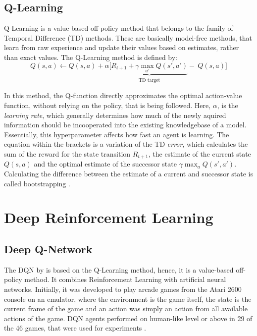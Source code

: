 \subsection{Q-Learning}
\label{ssec:q_learning}
Q-Learning is a value-based off-policy method that belongs to the family of Temporal Difference (TD) methods. These are basically model-free methods, that learn from raw experience and update their values based on estimates, rather than exact values. The Q-Learning method is defined by:
\begin{equation}
Q(s, a) \leftarrow Q(s, a) + \alpha \biggl[  \underbrace{{R_{t+1} + \gamma \max_{a'}  Q (s', a')}}_{\substack{\text{TD target}}} - \:Q (s, a)   \biggr]
\label{eq:q_learning}
\end{equation}

In this method, the Q-function directly approximates the optimal action-value function, without relying on the policy, that is being followed. Here, $\alpha$, is the \textit{learning rate}, which generally determines how much of the newly aquired information should be incooperated into the existing knowledgebase of a model. Essentially, this hyperparameter affects how fast an agent is learning. The equation within the brackets is a variation of the TD \textit{error}, which calculates the sum of the reward for the state transition $R_{t+1}$, the estimate of the current state $Q(s,a)$ and the optimal estimate of the successor state $\gamma \max_{a} Q (s', a')$. Calculating the difference between the estimate of a current and successor state is called bootstrapping \cite{richardsutton2018}.


\section{Deep Reinforcement Learning}

\subsection{Deep Q-Network}
\label{ssec:dqn}
The DQN by  is based on the Q-Learning method, hence, it is a value-based off-policy method. It combines Reinforcement Learning with artificial neural networks. Initially, it was developed to play arcade games from the Atari 2600 console on an emulator, where the environment is the game itself, the state is the current frame of the game and an action was simply an action from all available actions of the game. DQN agents performed on human-like level or above in 29 of the 46 games, that were used for experiments \cite{mnih2015human}.  

